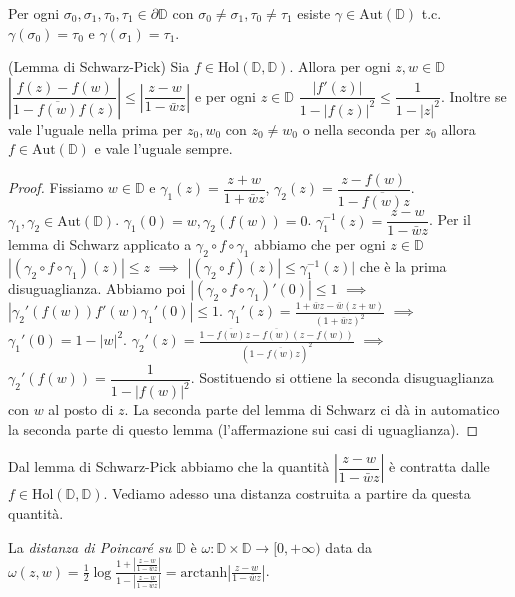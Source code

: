 \begin{exc}
  Per ogni $\sigma_0, \sigma_1, \tau_0, \tau_1 \in \partial\mathbb{D}$ con $\sigma_0\not=\sigma_1, \tau_0\not=\tau_1$ esiste $\gamma \in \text{Aut}(\mathbb{D})$ t.c. $\gamma(\sigma_0)=\tau_0$ e $\gamma(\sigma_1)=\tau_1$.
\end{exc}

\begin{lm}
  (Lemma di Schwarz-Pick) Sia $f \in \text{Hol}(\mathbb{D}, \mathbb{D})$.
  Allora per ogni $z, w \in \mathbb{D}$ $\left|\dfrac{f(z)-f(w)}{1-\overline{f(w)}f(z)}\right| \le \left|\dfrac{z-w}{1-\bar{w}z}\right|$ e per ogni $z \in \mathbb{D}$ $\dfrac{|f'(z)|}{1-|f(z)|^2} \le \dfrac{1}{1-|z|^2}$.
  Inoltre se vale l'uguale nella prima per $z_0, w_0$ con $z_0 \not=w_0$ o nella seconda per $z_0$ allora $f \in \text{Aut}(\mathbb{D})$ e vale l'uguale sempre.
\end{lm}

\begin{proof}
  Fissiamo $w \in \mathbb{D}$ e $\gamma_1(z)=\dfrac{z+w}{1+\bar{w}z}$, $\gamma_2(z)=\dfrac{z-f(w)}{1-\overline{f(w)}z}$. $\gamma_1, \gamma_2 \in \text{Aut}(\mathbb{D})$. $\gamma_1(0)=w, \gamma_2(f(w))=0$.
  $\gamma_1^{-1}(z)=\dfrac{z-w}{1-\bar{w}z}$.
  Per il lemma di Schwarz applicato a $\gamma_2 \circ f \circ \gamma_1$ abbiamo che per ogni $z \in \mathbb{D}$ $|(\gamma_2 \circ f \circ \gamma_1)(z)| \le z$ $\implies$ $|(\gamma_2 \circ f)(z)| \le \gamma_1^{-1}(z)|$ che è la prima disuguaglianza.
  Abbiamo poi $|(\gamma_2 \circ f \circ \gamma_1)'(0)| \le 1$ $\implies$ $|\gamma_2'(f(w))f'(w)\gamma_1'(0)| \le 1$. $\gamma_1'(z)=\frac{1+\bar{w}z-\bar{w}(z+w)}{(1+\bar{w}z)^2}$ $\implies$ $\gamma_1'(0)=1-|w|^2$.
  $\gamma_2'(z)=\frac{1-\overline{f(w)}z-\overline{f(w)}(z-f(w))}{(1-\overline{f(w)}z)^2}$ $\implies$ $\gamma_2'(f(w))=\dfrac{1}{1-|f(w)|^2}$. Sostituendo si ottiene la seconda disuguaglianza con $w$ al posto di $z$. La seconda parte del lemma di Schwarz ci dà in automatico la seconda parte di questo lemma (l'affermazione sui casi di uguaglianza).
\end{proof}

Dal lemma di Schwarz-Pick abbiamo che la quantità $\left|\dfrac{z-w}{1-\bar{w}z}\right|$ è contratta dalle $f \in \text{Hol}(\mathbb{D}, \mathbb{D})$. Vediamo adesso una distanza costruita a partire da questa quantità.

\begin{defn}
  La \textit{distanza di Poincaré su $\mathbb{D}$} è $\omega: \mathbb{D} \times \mathbb{D} \rightarrow [0, +\infty)$
  data da $\displaystyle \omega(z, w)=\frac{1}{2}\log{\frac{1+\left|\frac{z-w}{1-\bar{w}z}\right|}{1-\left|\frac{z-w}{1-\bar{w}z}\right|}}=\text{arctanh}{\left|\frac{z-w}{1-\bar{w}z}\right|}$.
\end{defn}

